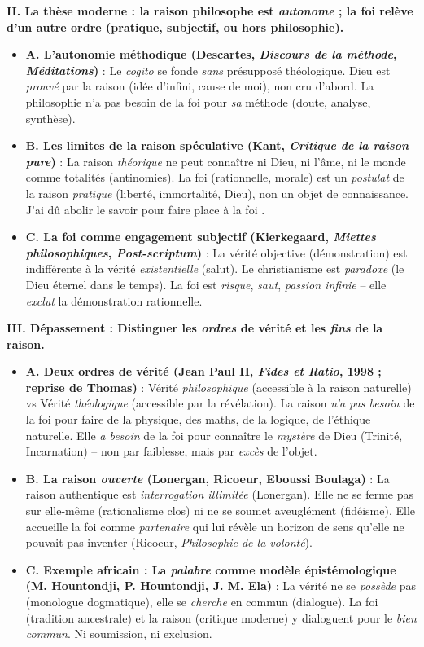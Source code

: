 \documentclass[11pt]{article}
\begin{document}
\begin{exoresolu}
\textbf{II. La thèse moderne : la raison philosophe est \emph{autonome} ; la foi relève d'un autre ordre (pratique, subjectif, ou hors philosophie).}
\begin{itemize}
    \item \textbf{A. L'autonomie méthodique (Descartes, \emph{Discours de la méthode}, \emph{Méditations})} : Le \emph{cogito} se fonde \emph{sans} présupposé théologique. Dieu est \emph{prouvé} par la raison (idée d'infini, cause de moi), non cru d'abord. La philosophie n'a pas besoin de la foi pour \emph{sa} méthode (doute, analyse, synthèse).
    \item \textbf{B. Les limites de la raison spéculative (Kant, \emph{Critique de la raison pure})} : La raison \emph{théorique} ne peut connaître ni Dieu, ni l'âme, ni le monde comme totalités (antinomies). La foi (rationnelle, morale) est un \emph{postulat} de la raison \emph{pratique} (liberté, immortalité, Dieu), non un objet de connaissance. \guillemotleft J'ai dû abolir le savoir pour faire place à la foi \guillemotright.
    \item \textbf{C. La foi comme engagement subjectif (Kierkegaard, \emph{Miettes philosophiques}, \emph{Post-scriptum})} : La vérité objective (démonstration) est indifférente à la vérité \emph{existentielle} (salut). Le christianisme est \emph{paradoxe} (le Dieu éternel dans le temps). La foi est \emph{risque}, \emph{saut}, \emph{passion infinie} -- elle \emph{exclut} la démonstration rationnelle.
\end{itemize}

\textbf{III. Dépassement : Distinguer les \emph{ordres} de vérité et les \emph{fins} de la raison.}
\begin{itemize}
    \item \textbf{A. Deux ordres de vérité (Jean Paul II, \emph{Fides et Ratio}, 1998 ; reprise de Thomas)} : Vérité \emph{philosophique} (accessible à la raison naturelle) vs Vérité \emph{théologique} (accessible par la révélation). La raison \emph{n'a pas besoin} de la foi pour faire de la physique, des maths, de la logique, de l'éthique naturelle. Elle \emph{a besoin} de la foi pour connaître le \emph{mystère} de Dieu (Trinité, Incarnation) -- non par faiblesse, mais par \emph{excès} de l'objet.
    \item \textbf{B. La raison \emph{ouverte} (Lonergan, Ricoeur, Eboussi Boulaga)} : La raison authentique est \emph{interrogation illimitée} (Lonergan). Elle ne se ferme pas sur elle-même (rationalisme clos) ni ne se soumet aveuglément (fidéisme). Elle accueille la foi comme \emph{partenaire} qui lui révèle un horizon de sens qu'elle ne pouvait pas inventer (Ricoeur, \emph{Philosophie de la volonté}).
    \item \textbf{C. Exemple africain : La \emph{palabre} comme modèle épistémologique (M. Hountondji, P. Hountondji, J. M. Ela)} : La vérité ne se \emph{possède} pas (monologue dogmatique), elle se \emph{cherche} en commun (dialogue). La foi (tradition ancestrale) et la raison (critique moderne) y dialoguent pour le \emph{bien commun}. Ni soumission, ni exclusion.
\end{itemize}


\end{exoresolu}
\end{document}
